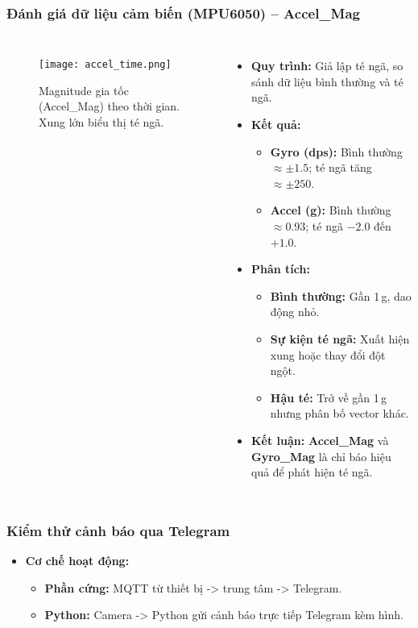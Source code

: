 \begin{frame}[t,fragile]
\frametitle{Đánh giá dữ liệu cảm biến (MPU6050) – Accel\_Mag}
\begin{columns}[T]
    \begin{figure}[H]
        \centering
        \texttt{[image: accel\_time.png]}
        \caption{Magnitude gia tốc (Accel\_Mag) theo thời gian. Xung lớn biểu thị té ngã.}
    \end{figure}

    \begin{itemize}
        \item \textbf{Quy trình:} Giả lập té ngã, so sánh dữ liệu bình thường và té ngã.
        \item \textbf{Kết quả:}
        \begin{itemize}
            \item \textbf{Gyro (dps):} Bình thường $\approx \pm 1.5$; té ngã tăng $\approx \pm 250$.
            \item \textbf{Accel (g):} Bình thường $\approx 0.93$; té ngã $-2.0$ đến $+1.0$.
        \end{itemize}
        \item \textbf{Phân tích:}
        \begin{itemize}
            \item \textbf{Bình thường:} Gần 1\,g, dao động nhỏ.
            \item \textbf{Sự kiện té ngã:} Xuất hiện xung hoặc thay đổi đột ngột.
            \item \textbf{Hậu té:} Trở về gần 1\,g nhưng phân bố vector khác.
        \end{itemize}
        \item \textbf{Kết luận:} \textbf{Accel\_Mag} và \textbf{Gyro\_Mag} là chỉ báo hiệu quả để phát hiện té ngã.
    \end{itemize}
\end{columns}
\end{frame}

\begin{frame}[t,fragile]
\frametitle{Kiểm thử cảnh báo qua Telegram}
\begin{itemize}
    \item \textbf{Cơ chế hoạt động:}
    \begin{itemize}
        \item \textbf{Phần cứng:} MQTT từ thiết bị -> trung tâm -> Telegram.
        \item \textbf{Python:} Camera -> Python gửi cảnh báo trực tiếp Telegram kèm hình.
    \end{itemize}
\end{itemize}
\end{frame}

